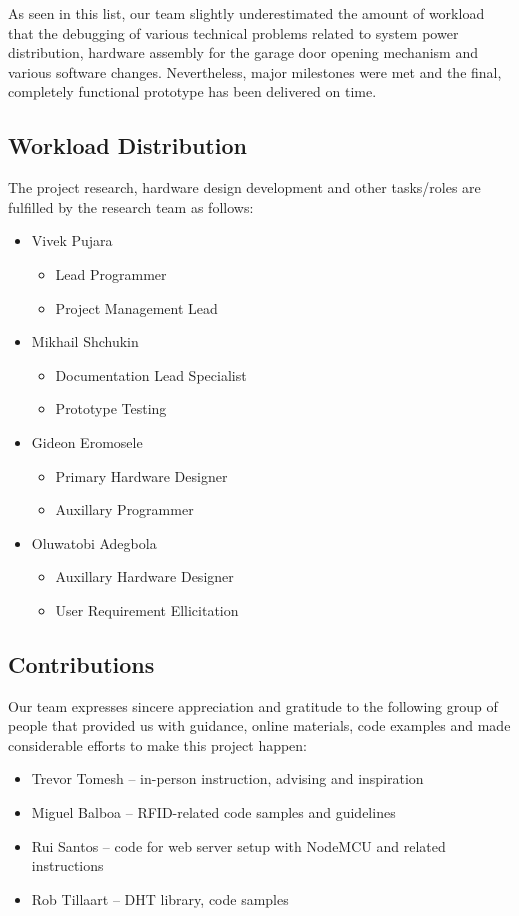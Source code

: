 \documentclass[journal,onecolumn]{IEEEtran}
\begin{document}
As seen in this list, our team slightly underestimated the amount of workload that the debugging of various technical problems related to system power distribution, hardware assembly for the garage door opening mechanism and various software changes. Nevertheless, major milestones were met and the final, completely functional prototype has been delivered on time.

\subsection{Workload Distribution}
The project research, hardware design development and other tasks/roles are fulfilled by the research team as follows:
\begin{itemize}
\item{Vivek Pujara}
	\begin{itemize}
	\item{Lead Programmer}
	\item{Project Management Lead}
	\end{itemize}
\item{Mikhail Shchukin}
	\begin{itemize}
	\item{Documentation Lead Specialist}
	\item{Prototype Testing}
	\end{itemize}
\item{Gideon Eromosele}
	\begin{itemize}
	\item{Primary Hardware Designer}
	\item{Auxillary Programmer}
	\end{itemize}
\item{Oluwatobi Adegbola}
	\begin{itemize}
	\item{Auxillary Hardware Designer}
	\item{User Requirement Ellicitation}
	\end{itemize}
\end{itemize}

\subsection{Contributions}
Our team expresses sincere appreciation and gratitude to the following group of people that provided us with guidance, online materials, code examples and made considerable efforts to make this project happen:

\begin{itemize}
	\item{Trevor Tomesh -- in-person instruction, advising and inspiration}
	\item{Miguel Balboa -- RFID-related code samples and guidelines \cite{IEEEhowto:RFID}}
	\item{Rui Santos -- code for web server setup with NodeMCU and related instructions \cite{IEEEhowto:ESP}}
	\item{Rob Tillaart -- DHT library, code samples \cite{IEEEhowto:DHT}}
\end{itemize}
\end{document}
